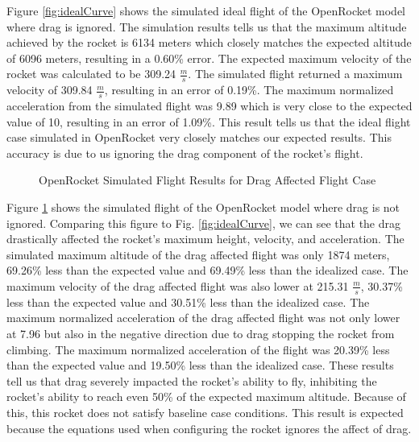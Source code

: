 \documentclass{report}
\begin{document}
\noindent Figure \ref{fig:idealCurve} shows the simulated ideal flight of the OpenRocket model where drag is ignored. 
The simulation results tells us that the maximum altitude achieved by the rocket is 6134 meters which closely matches the expected altitude of 6096 meters, resulting in a 0.60\% error.
The expected maximum velocity of the rocket was calculated to be 309.24 $\frac{m}{s}$.
The simulated flight returned a maximum velocity of 309.84 $\frac{m}{s}$, resulting in an error of 0.19\%.
The maximum normalized acceleration from the simulated flight was 9.89 which is very close to the expected value of 10, resulting in an error of 1.09\%.
This result tells us that the ideal flight case simulated in OpenRocket very closely matches our expected results.
This accuracy is due to us ignoring the drag component of the rocket's flight.\\

\begin{figure}[h!]
    \centering
    \caption{OpenRocket Simulated Flight Results for Drag Affected Flight Case}
    \label{fig:dragCurve}
\end{figure}

\noindent Figure \ref{fig:dragCurve} shows the simulated flight of the OpenRocket model where drag is not ignored.
Comparing this figure to Fig. \ref{fig:idealCurve}, we can see that the drag drastically affected the rocket's maximum height, velocity, and acceleration.
The simulated maximum altitude of the drag affected flight was only 1874 meters, 69.26\% less than the expected value and 69.49\% less than the idealized case.
The maximum velocity of the drag affected flight was also lower at 215.31 $\frac{m}{s}$, 30.37\% less than the expected value and 30.51\% less than the idealized case.
The maximum normalized acceleration of the drag affected flight was not only lower at 7.96 but also in the negative direction due to drag stopping the rocket from climbing.
The maximum normalized acceleration of the flight was 20.39\% less than the expected value and 19.50\% less than the idealized case.
These results tell us that drag severely impacted the rocket's ability to fly, inhibiting the rocket's ability to reach even 50\% of the expected maximum altitude.
Because of this, this rocket does not satisfy baseline case conditions.
This result is expected because the equations used when configuring the rocket ignores the affect of drag.\\
\end{document}
